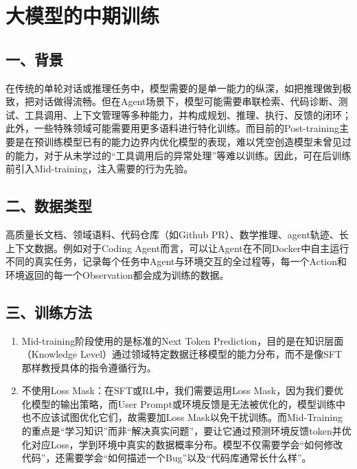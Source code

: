 \setcounter{section}{3}

\hypertarget{ux5927ux6a21ux578bux7684ux4e2dux671fux8badux7ec3}{%
\section{大模型的中期训练}\label{ux5927ux6a21ux578bux7684ux4e2dux671fux8badux7ec3}}

\hypertarget{ux4e00ux80ccux666f}{%
\subsection{一、背景}\label{ux4e00ux80ccux666f}}

在传统的单轮对话或推理任务中，模型需要的是单一能力的纵深，如把推理做到极致，把对话做得流畅。但在Agent场景下，模型可能需要串联检索、代码诊断、测试、工具调用、上下文管理等多种能力，并构成规划、推理、执行、反馈的闭环；此外，一些特殊领域可能需要用更多语料进行特化训练。而目前的Post-training主要是在预训练模型已有的能力边界内优化模型的表现，难以凭空创造模型未曾见过的能力，对于从未学过的``工具调用后的异常处理''等难以训练。因此，可在后训练前引入Mid-training，注入需要的行为先验。

\hypertarget{ux4e8cux6570ux636eux7c7bux578b}{%
\subsection{二、数据类型}\label{ux4e8cux6570ux636eux7c7bux578b}}

高质量长文档、领域语料、代码仓库（如Github PR）、数学推理、agent轨迹、长上下文数据。例如对于Coding Agent而言，可以让Agent在不同Docker中自主运行不同的真实任务，记录每个任务中Agent与环境交互的全过程等，每一个Action和环境返回的每一个Observation都会成为训练的数据。

\hypertarget{ux4e09ux8badux7ec3ux65b9ux6cd5}{%
\subsection{三、训练方法}\label{ux4e09ux8badux7ec3ux65b9ux6cd5}}

\begin{enumerate}
\def\labelenumi{\arabic{enumi}.}
\item
  Mid-training阶段使用的是标准的Next Token Prediction，目的是在知识层面（Knowledge Level）通过领域特定数据迁移模型的能力分布，而不是像SFT那样教授具体的指令遵循行为。
\item
  不使用Loss Mask：在SFT或RL中，我们需要运用Loss Mask，因为我们要优化模型的输出策略，而User Prompt或环境反馈是无法被优化的，模型训练中也不应该试图优化它们，故需要加Loss Mask以免干扰训练。而Mid-Training的重点是``学习知识''而非``解决真实问题''，要让它通过预测环境反馈token并优化对应Loss，学到环境中真实的数据概率分布。模型不仅需要学会``如何修改代码''，还需要学会``如何描述一个Bug''以及``代码库通常长什么样''。
\end{enumerate}

